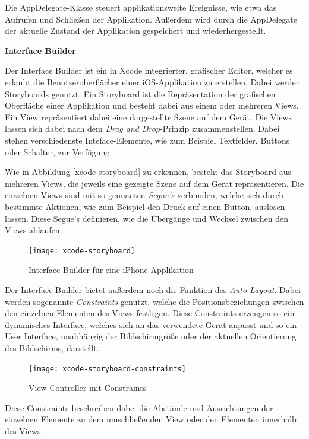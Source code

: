 Die AppDelegate-Klasse steuert applikationsweite Ereignisse, wie etwa das Aufrufen und Schließen der Applikation. Außerdem wird durch die AppDelegate der aktuelle Zustand der Applikation gespeichert und wiederhergestellt.


\textbf{Interface Builder}

Der Interface Builder ist ein in Xcode integrierter, grafischer Editor, welcher es erlaubt die Benutzeroberflächer einer iOS-Applikation zu erstellen. Dabei werden Storyboards genutzt.
Ein Storyboard ist die Repräsentation der grafischen Oberfläche einer Applikation und besteht dabei aus einem oder mehreren Views.
Ein View repräsentiert dabei eine dargestellte Szene auf dem Gerät.
Die Views lassen sich dabei nach dem \emph{Drag and Drop}-Prinzip zusammenstellen. Dabei stehen verschiedenste Inteface-Elemente, wie zum Beispiel Textfelder, Buttons oder Schalter, zur Verfügung.

Wie in Abbildung \ref{xcode-storyboard} zu erkennen, besteht das Storyboard aus mehreren Views, die jeweils eine gezeigte Szene auf dem Gerät repräsentieren. Die einzelnen Views sind mit so gennanten \emph{Segue's} verbunden, welche sich durch bestimmte Aktionen, wie zum Beispiel den Druck auf einen Button, auslösen lassen. Diese Segue's definieren, wie die Übergänge und Wechsel zwischen den Views ablaufen.

\begin{figure}[htb!]
	\centering
	\texttt{[image: xcode-storyboard]}
	\caption{Interface Builder für eine iPhone-Applikation}
	\label{xcode-interface-builder}
\end{figure}

Der Interface Builder bietet außerdem noch die Funktion des \emph{Auto Layout}. Dabei werden sogenannte \emph{Constraints} genutzt, welche die Positionsbeziehungen zwischen den einzelnen Elementen des Views festlegen. Diese Constraints erzeugen so ein dynamisches Interface, welches sich an das verwendete Gerät anpasst und so ein User Interface, unabhängig der Bildschirmgröße oder der aktuellen Orientierung des Bildschirms, darstellt.

\begin{figure}[htb!]
		\centering
	\texttt{[image: xcode-storyboard-constraints]}
	\caption{View Controller mit Constraints}
	\label{xcode-storyboard-constraints}
\end{figure}

Diese Constraints beschreiben dabei die Abstände und Ausrichtungen der einzelnen Elemente zu dem umschließenden View oder den Elementen innerhalb des Views.

